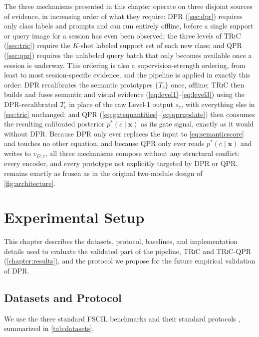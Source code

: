 \documentclass{iutbscthesis}
\begin{document}
The three mechanisms presented in this chapter operate on three disjoint sources of evidence, in increasing order of what they require: DPR (\autoref{sec:dpr}) requires only class labels and prompts and can run entirely offline, before a single support or query image for a session has even been observed; the three levels of \textsc{TRiC} (\autoref{sec:tric}) require the $K$-shot labeled support set of each new class; and QPR (\autoref{sec:qpr}) requires the unlabeled query batch that only becomes available once a session is underway. This ordering is also a supervision-strength ordering, from least to most session-specific evidence, and the pipeline is applied in exactly this order: DPR recalibrates the semantic prototypes $\{T_c\}$ once, offline; \textsc{TRiC} then builds and fuses semantic and visual evidence (\autoref{eq:level1}--\autoref{eq:level3}) using the DPR-recalibrated $T_c$ in place of the raw Level-1 output $s_c$, with everything else in \autoref{sec:tric} unchanged; and QPR (\autoref{eq:gatequantities}--\autoref{eq:qprupdate}) then consumes the resulting calibrated posterior $p^*(c\mid\mathbf{x})$ as its gate signal, exactly as it would without DPR. Because DPR only ever replaces the input to \autoref{eq:semanticscore} and touches no other equation, and because QPR only ever reads $p^*(c\mid\mathbf{x})$ and writes to $v_{D,c}$, all three mechanisms compose without any structural conflict: every encoder, and every prototype not explicitly targeted by DPR or QPR, remains exactly as frozen as in the original two-module design of \autoref{fig:architecture}.


\chapter{Experimental Setup}
\label{chapter:experiments}

This chapter describes the datasets, protocol, baselines, and implementation details used to evaluate the validated part of the pipeline, \textsc{TRiC} and \textsc{TRiC}-QPR (\autoref{chapter:results}), and the protocol we propose for the future empirical validation of DPR.

\section{Datasets and Protocol}

We use the three standard FSCIL benchmarks and their standard protocols \autocite{tao2020fewshot, chen2025bimc}, summarized in \autoref{tab:datasets}.
\end{document}
